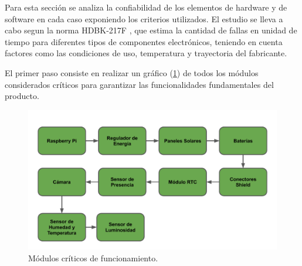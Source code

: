 %

%
Para esta sección se analiza la confiabilidad de los elementos de hardware y de software en cada caso exponiendo los criterios utilizados.
El estudio se lleva a cabo segun la norma HDBK-217F , que estima la cantidad de fallas en unidad de tiempo para diferentes tipos de componentes electrónicos, teniendo en cuenta factores como las condiciones de uso, temperatura y trayectoria del fabricante.

El primer paso consiste en realizar un gráfico (\ref{fig:criticos}) de todos los módulos  considerados críticos para garantizar las funcionalidades fundamentales del producto.

\begin{figure}[H]
	\centering
	\includegraphics[width=0.9\linewidth,page=1]{ImagenesEstudios/ModulosCriticos}		
	\caption{Módulos críticos de funcionamiento.}
	\label{fig:criticos}
\end{figure}

%
